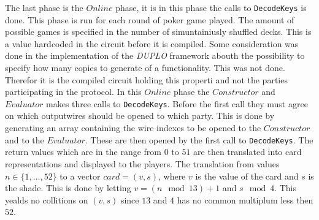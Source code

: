 \documentclass[twoside,11pt,openright]{report}
\newcommand{\DUPLO}{\textit{DUPLO} }
\begin{document}
The last phase is the $Online$ phase, it is in this phase the calls to \verb|DecodeKeys| is done. This phase is run for each round of poker game played. The amount of possible games is specified in the number of simuntainiusly shuffled decks. This is a value hardcoded in the circuit before it is compiled. Some consideration was done in the implementation of the \DUPLO framework abouth the possibility to specify how many copies to generate of a functionality. This was not done. Therefor it is the compiled circuit holding this properti and not the parties participating in the protocol. In this $Online$ phase the $Constructor$ and $Evaluator$ makes three calls to \verb|DecodeKeys|. Before the first call they must agree on which outputwires should be opened to which party. This is done by generating an array containing the wire indexes to be opened to the $Constructor$ and to the $Evaluator$. These are then opened by the first call to \verb|DecodeKeys|. The return values which are in the range from $0$ to $51$ are then translated into card representations and displayed to the players. The translation from values $n\in \{1,\dots,52\}$ to a vector $card=(v,s)$, where $v$ is the value of the card and $s$ is the shade. This is done by letting $v=(n \mod 13)+1$ and $s \mod 4$. This yealds no collitions on $(v,s)$ since $13$ and $4$ has no common multiplum less then $52$.
\end{document}
